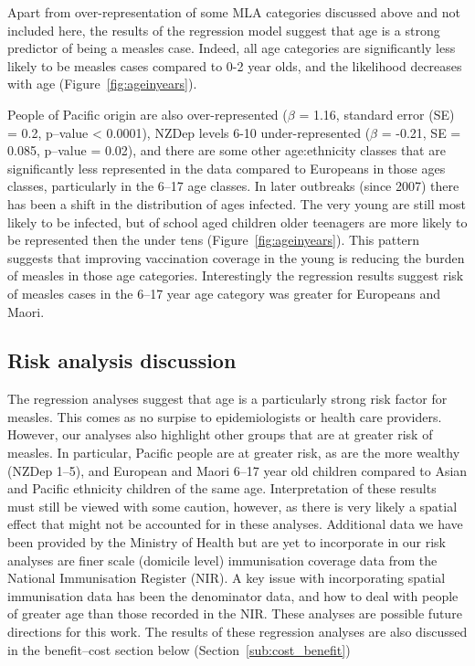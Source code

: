 \documentclass{article}
\begin{document}
Apart from over-representation of some MLA categories discussed above and not included here, the results of the regression model suggest that age is a strong predictor of being a measles case. Indeed, all age categories are significantly less likely to be measles cases compared to 0-2 year olds, and the likelihood decreases with age (Figure~\ref{fig:ageinyears}).

People of Pacific origin are also over-represented ($\beta$ = 1.16, standard error (SE) = 0.2, p--value < 0.0001), NZDep levels 6-10 under-represented ($\beta$ = -0.21, SE = 0.085, p--value = 0.02), and there are some other age:ethnicity classes that are significantly less represented in the data compared to Europeans in those ages classes, particularly in the 6--17 age classes. In later outbreaks (since 2007) there has been a shift in the distribution of ages infected. The very young are still most likely to be infected, but of school aged children older teenagers are more likely to be represented then the under tens (Figure~\ref{fig:ageinyears}). This pattern suggests that improving vaccination coverage in the young is reducing the burden of measles in those age categories. Interestingly the regression results suggest risk of measles cases in the 6--17 year age category was greater for Europeans and Maori.


\subsection{Risk analysis discussion}

The regression analyses suggest that age is a particularly strong risk factor for measles. This comes as no surpise to epidemiologists or health care providers. However, our analyses also highlight other groups that are at greater risk of measles. In particular, Pacific people are at greater risk, as are the more wealthy (NZDep 1--5), and European and Maori 6--17 year old children compared to Asian and Pacific ethnicity children of the same age. Interpretation of these results must still be viewed with some caution, however, as there is very likely a spatial effect that might not be accounted for in these analyses. Additional data we have been provided by the Ministry of Health but are yet to incorporate in our risk analyses are finer scale (domicile level) immunisation coverage data from the National Immunisation Register (NIR). A key issue with incorporating spatial immunisation data has been the denominator data, and how to deal with people of greater age than those recorded in the NIR. These analyses are possible future directions for this work. The results of these regression analyses are also discussed in the benefit--cost section below (Section~\ref{sub:cost_benefit})
\end{document}
